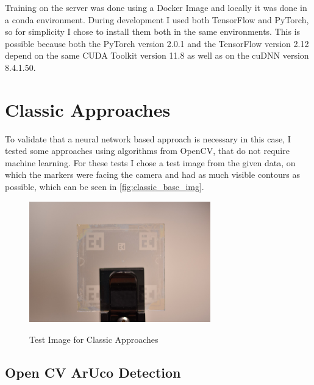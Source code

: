 \documentclass[10pt]{book}
\begin{document}
Training on the server was done using a Docker Image and locally it was done in a conda environment. During development I used both TensorFlow and PyTorch, so for simplicity I chose to install them both in the same environments. This is possible because both the PyTorch version 2.0.1 and the TensorFlow version 2.12 depend on the same \ac{CUDA} Toolkit version 11.8 as well as on the \ac{cuDNN} version 8.4.1.50.

\section{Classic Approaches}

To validate that a neural network based approach is necessary in this case, I tested some approaches using algorithms from \ac{OpenCV}, that do not require machine learning. For these tests I chose a test image from the given data, on which the markers were facing the camera and had as much visible contours as possible, which can be seen in \autoref{fig:classic_base_img}. 

\begin{figure}
  \caption{Test Image for Classic Approaches}
  \includegraphics[width=0.7\textwidth]{image/classic_base_img}
  \label{fig:classic_base_img}
\end{figure}

\subsection{Open CV ArUco Detection}
\end{document}
